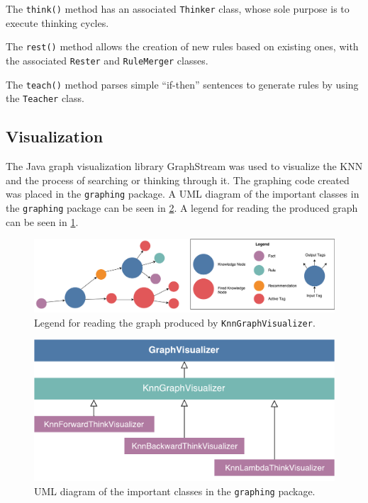 \documentclass[titlepage,11pt]{article}
\newcommand{\code}[1]{\texttt{#1}}
\begin{document}
The \code{think()} method has an associated \code{Thinker} class, whose sole purpose is to execute thinking cycles. 

The \code{rest()} method allows the creation of new rules based on existing ones, with the associated \code{Rester} and \code{RuleMerger} classes.

The \code{teach()} method parses simple ``if-then'' sentences to generate rules by using the \code{Teacher} class.

\subsection{Visualization}
The Java graph visualization library GraphStream was used to visualize the KNN and the process of searching or thinking through it. The graphing code created was placed in the \code{graphing} package. A UML diagram of the important classes in the \code{graphing} package can be seen in \cref{fig:uml_graphing}. A legend for reading the produced graph can be seen in \cref{fig:knn_graph_legend}.

\begin{figure}[!htb]
	\includegraphics[width=\textwidth]{figures/knn_graph_legend.pdf}
	\caption{Legend for reading the graph produced by \code{KnnGraphVisualizer}.}
	\label{fig:knn_graph_legend}
\end{figure}

\begin{figure}[!htb]
	\includegraphics[width=\columnwidth]{figures/uml_graphing.pdf}
	\caption{UML diagram of the important classes in the \code{graphing} package.}
	\label{fig:uml_graphing}
\end{figure}
\end{document}
